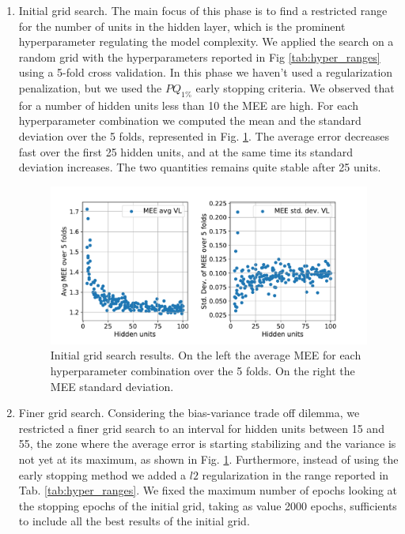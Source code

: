 \documentclass[11pt,twoside]{article}
\begin{document}
\begin{enumerate}
\item Initial grid search. The main focus of this phase is to find a restricted range for the number of units in the hidden layer, which is the prominent hyperparameter regulating the model complexity. We applied the search on a random grid with the hyperparameters reported in Fig \ref{tab:hyper_ranges} using a 5-fold cross validation. In this phase we haven't used a regularization penalization, but we used the $PQ_{1\%}$ early stopping criteria. We observed that for a number of hidden units less than 10 the MEE are high. For each hyperparameter combination we computed the mean and the standard deviation over the 5 folds, represented in Fig. \ref{fig:initial-grid}. The average error decreases fast over the first 25 hidden units, and at the same time its standard deviation increases. The two quantities remains quite stable after 25 units.

  \begin{figure}[htbp]
    \centering
    \includegraphics[width=1.0\textwidth]{img/initial_grid.pdf}
\caption{Initial grid search results. On the left the average MEE for each hyperparameter combination over the 5 folds. On the right the MEE standard deviation.}
    \label{fig:initial-grid}
  \end{figure}


\item Finer grid search. Considering the bias-variance trade off dilemma, we restricted a finer grid search to an interval for hidden units between 15 and 55, the zone where the average error is starting stabilizing and the variance is not yet at its maximum, as shown in Fig. \ref{fig:initial-grid}. Furthermore, instead of using the early stopping method we added a $l2$ regularization in the range reported in Tab. \ref{tab:hyper_ranges}. We fixed the maximum number of epochs looking at the stopping epochs of the initial grid, taking as value 2000 epochs, sufficients to include all the best results of the initial grid.


\end{enumerate}
\end{document}
